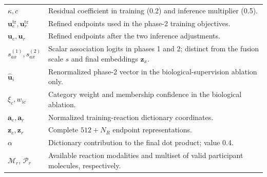 \begin{longtable}{>{\raggedright\arraybackslash}p{}>{\raggedright\arraybackslash}p{}}
$\kappa,c$ & Residual coefficient in training (0.2) and inference multiplier (0.5).\\
$\mathbf{u}_e^{\mathrm{tr}},\mathbf{u}_r^{\mathrm{tr}}$ & Refined endpoints used in the phase-2 training objectives.\\
$\mathbf{u}_e,\mathbf{u}_r$ & Refined endpoints after the two inference adjustments.\\
$s_{ax}^{(1)},s_{ax}^{(2)}$ & Scalar association logits in phases 1 and 2; distinct from the fusion scale $s$ and final embeddings $\mathbf z_x$.\\
$\hat{\mathbf u}_i$ & Renormalized phase-2 vector in the biological-supervision ablation only.\\
$\xi_c,w_{ic}$ & Category weight and membership confidence in the biological ablation.\\
$\mathbf{a}_e,\mathbf{a}_r$ & Normalized training-reaction dictionary coordinates.\\
$\mathbf{z}_e,\mathbf{z}_r$ & Complete $512+N_R$ endpoint representations.\\
$\alpha$ & Dictionary contribution to the final dot product; value 0.4.\\
$\mathcal M_r$, $\mathcal P_r$ & Available reaction modalities and multiset of valid participant molecules, respectively.\\
\bottomrule
\end{longtable}

